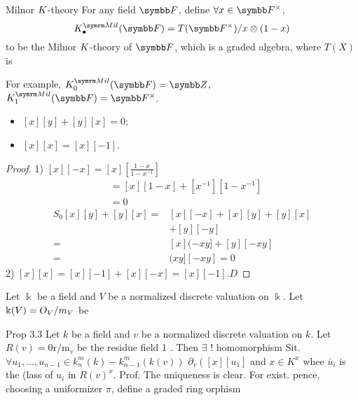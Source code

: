 
\begin{definition}{Milnor $\relax{K}$-theory}{}
	For any field $\FF$, define $\forall x\in\FF^{\times}$,
	\[\K_\bullet^\Mil(\FF)=T(\FF^\times)/x\otimes(1-x)\]
	to be the Milnor $\relax{K}$-theory of $\FF$, which is a graded algebra, where $T(X)$ is 
\end{definition}
For example, $\K_0^\Mil(\FF) = \ZZ$, $\K_1^\Mil(\FF) = \FF^\times$. 

\begin{proposition}{}{}
	\begin{itemize}
		\item $[x][y]+[y][x]=0$;
		\item $[x][x]=[x][-1]$. 
	\end{itemize}  
\end{proposition}

\begin{proof}
1) $[x][-x]=[x]\left[\frac{1-x}{1-x^{-1}}\right]$
\[
\begin{aligned}
& =[x][1-x]+\left[x^{-1}\right]\left[1-x^{-1}\right] \\
& =0
\end{aligned}
\]
\[
\begin{aligned}
S_0[x][y]+[y][x]= & {[x][-x]+[x][y]+[y][x] } \\
& +[y][-y] \\
= & {[x](-x y]+[y][-x y] } \\
= & (x y][-x y]=0
\end{aligned}
\]
2) $[x][x]=[x][-1]+[x][-x]=[x][-1] . D$
\end{proof}
\begin{proposition}
	Let $\Bbbk$ be a field and $V$ be a normalized discrete valuation on $\Bbbk$. Let $\Bbbk(V)=\relax{O}_V/m_V$ be
\end{proposition}
Prop 3.3 Let $k$ be a field and $v$ be a normalized discrete valuation on $k$. Let $R(v)=0 \mathrm{r} / \mathrm{m}_v$ be the residue field 1 . Then $\exists$ ! homomorphism
Sit. $\forall u_1, \ldots, u_{n-1} \in k_n^m(k)-k_{n-1}^m(k(v))$ $\partial_v\left([x]\left[u_1\right]\right.$ and $x \in K^x$
whee $\bar{u}_i$ is the (lass of $u_i$ in $R(v)^x$.
Prof. The uniqueness is clear. For exist. pence, choosing a uniformizer $\pi$, define a graded ring orphism
